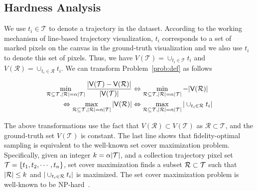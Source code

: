 \subsection{Hardness Analysis}\label{sec:hard}
We use $t_i \in \mathcal{T}$ to denote a trajectory in the dataset. According to the working mechanism of line-based trajectory visualization, $t_i$ corresponds to a set of marked pixels on the canvas in the ground-truth visualization and we also use $t_i$ to denote this set of pixels. Thus, we have $V(\mathcal{T}) = \cup_{t_i \in \mathcal{T}} t_i$ and $V(\mathcal{R}) = \cup_{t_i \in \mathcal{R}} t_i$. We can transform Problem~\ref{prob:def} as follows

\begin{align}\label{eqn:obj2} \nonumber
\min_{\oR \subseteq \D, |\oR| = \alpha |\D|}  \frac{|\V(\D) - \V(\oR)|}{|\V(\D)|}  & \Leftrightarrow \min_{\oR \subseteq \D, |\oR| = \alpha |\D|}   - |\V(\oR)| \\ \nonumber
 \Leftrightarrow \max_{\oR \subseteq \D, |\oR| = \alpha |\D|}  |\V(\oR)| &  \Leftrightarrow \max_{\oR \subseteq \D, |\oR| = \alpha |\D|} | \cup_{t_i \in \oR} t_i |
\end{align}

The above transformations use the fact that $V(\mathcal{R}) \subset V(\mathcal{T})$ as $\mathcal{R} \subset \mathcal{T}$, and the ground-truth set $V(\mathcal{T})$ is constant. The last line shows that fidelity-optimal sampling is equivalent to the well-known set cover maximization problem.
Specifically, given an integer $k = \alpha |\mathcal{T}|$, and a collection trajectory pixel set $\mathcal{T} = \{t_1, t_2, \cdots, t_n \}$, set cover maximization finds a subset $\mathcal{R} \subset \mathcal{T}$ such that $|\mathcal{R}| \leq k$ and $|\cup_{t_i \in \mathcal{R}} t_i|$ is maximized. The set cover maximization problem is well-known to be NP-hard~\cite{setcover}.





